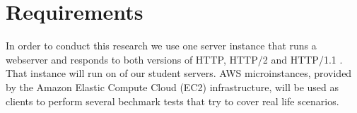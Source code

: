 \section{Requirements}
\label{req}
In order to conduct this research we use one server instance that runs a webserver and responds to both versions of HTTP, HTTP/2 and HTTP/1.1 \cite{http2-imp}. That instance will run on of our student servers. AWS microinstances, provided by the Amazon Elastic Compute Cloud (EC2) \cite{amazon} infrastructure, will be used as clients to perform several bechmark tests that try to cover real life scenarios. 
